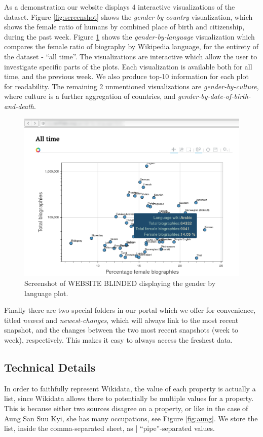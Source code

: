 \documentclass[letterpaper]{article}
\begin{document}
As a demonstration our website displays 4 interactive visualizations of the dataset. Figure \ref{fig:screenshot} shows the \textit{gender-by-country} visualization, which shows the female ratio of humans by combined place of birth and citizenship, during the past week. Figure \ref{fig:screenshot2} shows the \textit{gender-by-language} visualization which compares the female ratio of biography by Wikipedia language, for the entirety of the dataset - ``all time''. The visualizations are interactive which allow the user to investigate specific parts of the plots. Each visualization is available both for all time, and the previous week. We also produce top-10 information for each plot for readability. The remaining 2 unmentioned visualizations are \textit{gender-by-culture}, where culture is a further aggregation of countries, and \textit{gender-by-date-of-birth-and-death}.

\begin{figure}
\label{fig:screenshot2}
\includegraphics[scale=0.25]{figures/screenshot2.png} 
\caption{Screenshot of WEBSITE BLINDED displaying the gender by language plot.}
\end{figure}

Finally there are two special folders in our portal which we offer for convenience,  titled \textit{newest} and \textit{newest-changes}, which will always link to the most recent snapshot, and the changes between the two most recent snapshots (week to week), respectively. This makes it easy to always access the freshest data.

\subsection{Technical Details}
In order to faithfully represent Wikidata, the value of each property is actually a list, since Wikidata allows there to potentially be multiple values for a property. This is because either two sources disagree on a property, or like in the case of Aung San Suu Kyi, she has many occupations, see Figure \ref{fig:aung}. We store the list, inside the comma-separated sheet, as | ``pipe''-separated values.
\end{document}
